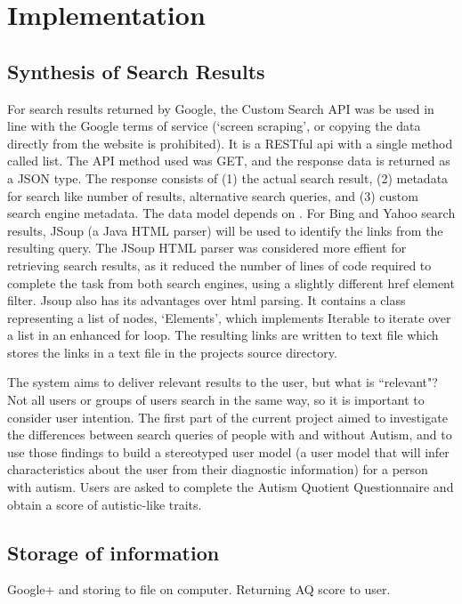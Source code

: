 \documentclass[a4paper, 11pt]{article}
\begin{document}
\section{Implementation}

\subsection{Synthesis of Search Results}
For search results returned by Google, the Custom Search API was be used in line with the Google terms of service (`screen scraping', or copying the data directly from the website is prohibited). It is a RESTful api with a single method called list. The API method used was GET, and the response data is returned as a JSON type. The response consists of (1) the actual search result, (2) metadata for search like number of  results, alternative search queries, and (3) custom search engine metadata. The data model depends on \cite{opensearch}.
For Bing and Yahoo search results, JSoup (a Java HTML parser) will be used to identify the links from the resulting query. The JSoup HTML parser was considered more effient for retrieving search results, as it reduced the number of lines of code required to complete the task from both search engines, using a slightly different href element filter. Jsoup also has its advantages over html parsing. It contains a class representing a list of nodes, `Elements', which implements Iterable to iterate over a list in an enhanced for loop.
The resulting links are written to text file which stores the links in a text file in the projects source directory.


The system aims to deliver relevant results to the user, but what is ``relevant"? Not all users or groups of users search in the same way, so it is important to consider user intention. The first part of the current project aimed to investigate the differences between search queries of people with and without Autism, and to use those findings to build a stereotyped user model (a user model that will infer characteristics about the user from their diagnostic information) for a person with autism. Users are asked to complete the Autism Quotient Questionnaire and obtain a score of autistic-like traits.

\subsection{Storage of information}
Google+ and storing to file on computer.
Returning AQ score to user.
\end{document}
